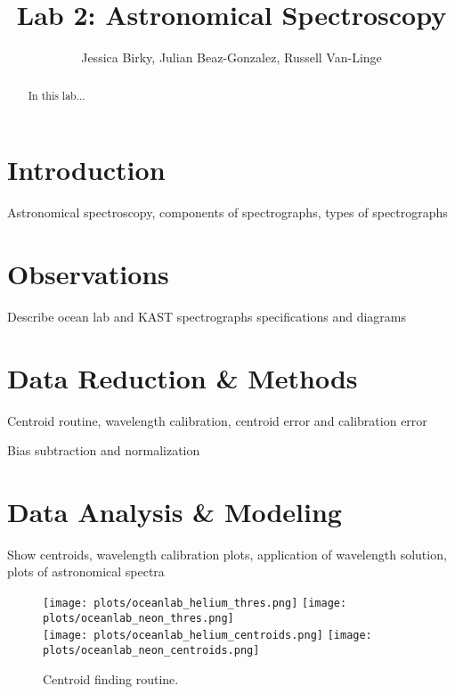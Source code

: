 \documentclass[preprint]{aastex62}
\begin{document}
\title{\sc Lab 2: Astronomical Spectroscopy}
\author{Jessica Birky, Julian Beaz-Gonzalez, Russell Van-Linge}


\begin{abstract}
In this lab... 

\end{abstract}
\bigskip

\section{Introduction} 
Astronomical spectroscopy, components of spectrographs, types of spectrographs

\section{Observations} \label{sec:observations}
Describe ocean lab and KAST spectrographs specifications and diagrams

\section{Data Reduction \& Methods} \label{sec:methods}
Centroid routine, wavelength calibration, centroid error and calibration error

Bias subtraction and normalization

\section{Data Analysis \& Modeling} \label{sec:analysis}
Show centroids, wavelength calibration plots, application of wavelength solution, plots of astronomical spectra

\begin{figure}[]
\begin{center}
\texttt{[image: plots/oceanlab\_helium\_thres.png]}
\texttt{[image: plots/oceanlab\_neon\_thres.png]} \\
\texttt{[image: plots/oceanlab\_helium\_centroids.png]}
\texttt{[image: plots/oceanlab\_neon\_centroids.png]}
\caption{Centroid finding routine.}
\end{center}
\end{figure}
\end{document}
